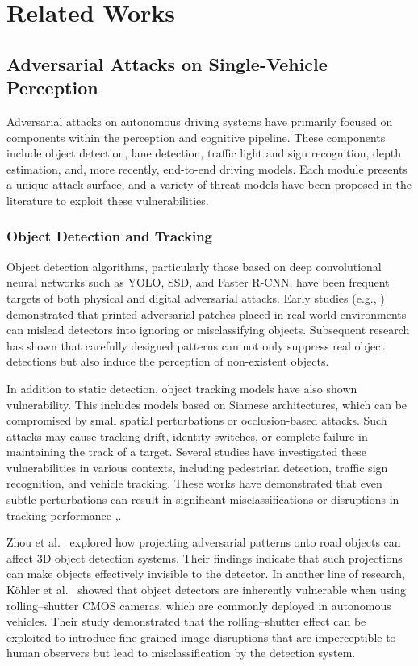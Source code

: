 \chapter{Related Works}
\label{related-works}


\section{Adversarial Attacks on Single-Vehicle Perception}

Adversarial attacks on autonomous driving systems have primarily focused on components within the perception and cognitive pipeline. 
These components include object detection, lane detection, traffic light and sign recognition, depth estimation, and, more recently, end-to-end driving models. 
Each module presents a unique attack surface, and a variety of threat models have been proposed in the literature to exploit these vulnerabilities.

\subsection{Object Detection and Tracking}
Object detection algorithms, particularly those based on deep convolutional neural networks such as YOLO, SSD, and Faster R-CNN, have been frequent targets of both physical and digital adversarial attacks. 
Early studies (e.g., \cite{DBLP:journalscorrabs-1712-09665}) demonstrated that printed adversarial patches placed in real-world environments can mislead detectors into ignoring or misclassifying objects. 
Subsequent research has shown that carefully designed patterns can not only suppress real object detections but also induce the perception of non-existent objects.

In addition to static detection, object tracking models have also shown vulnerability. 
This includes models based on Siamese architectures, which can be compromised by small spatial perturbations or occlusion-based attacks. 
Such attacks may cause tracking drift, identity switches, or complete failure in maintaining the track of a target. 
Several studies have investigated these vulnerabilities in various contexts, including pedestrian detection, traffic sign recognition, and vehicle tracking. 
These works have demonstrated that even subtle perturbations can result in significant misclassifications or disruptions in tracking performance \cite{10.11453372297.3423359},\cite{10.11453548606.3559390}.

Zhou et al.\ \cite{zhou2024transientadversarial3dprojection} explored how projecting adversarial patterns onto road objects can affect 3D object detection systems. 
Their findings indicate that such projections can make objects effectively invisible to the detector. In another line of research, Köhler et al.\ \cite{köhler2021rollininherentvulnerabilityrolling} showed that object detectors are inherently vulnerable when using rolling–shutter CMOS cameras, which are commonly deployed in autonomous vehicles. 
Their study demonstrated that the rolling–shutter effect can be exploited to introduce fine-grained image disruptions that are imperceptible to human observers but lead to misclassification by the detection system.

